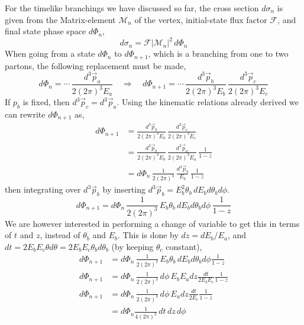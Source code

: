 \documentclass[main.tex]{subfiles}
\begin{document}
For the timelike branchings we have discussed so far, the cross section \(d\sigma_n\) is given from the Matrix-element \(\mathcal{M}_n\) of the vertex, initial-state flux factor \(\mathcal{F}\), and final state phase space \(d\Phi_n\),
\begin{equation}
    d\sigma_n = \mathcal{F} |\mathcal{M}_n|^2 \, d\Phi_n
\end{equation}
When going from a state \(d\Phi_n\) to \(d\Phi_{n+1}\), which is a branching from one to two partons, the following replacement must be made, 
\begin{equation}
    d\Phi_n = \cdots \, \frac{d^3 \vec p_a}{2(2\pi)^3 E_a} \quad \Rightarrow \quad d\Phi_{n+1} = \cdots \, \frac{d^3 \vec p_b}{2 (2\pi)^3 E_b} \, \frac{d^3 \vec p_c}{2(2\pi)^3 E_c}
\end{equation}
If \(p_b\) is fixed, then \(d^3 \vec p_c = d^3 \vec p_a\). Using the kinematic relations already derived we can rewrite \(d\Phi_{n+1}\) as,
 \begin{align}
    d\Phi_{n+1} &= \frac{d^3 \vec p_b}{2(2\pi)^3 E_b}\, \frac{d^3 \vec p_c}{2(2\pi)^3 E_c} \nonumber\\
    &=\frac{d^3 \vec p_b}{2(2\pi)^3 E_b} \,\frac{d^3 \vec p_a}{2(2\pi)^3 E_a}\, \frac{1}{1-z} \nonumber\\
    &= d\Phi_n\, \frac{1}{2(2\pi)^3}\, \frac{d^3 \vec p_b}{E_b} \,\frac{1}{1-z}
 \end{align}
then integrating over \(d^3\vec p _b\) by inserting \(d^3\vec p_b = E_b^2\theta_b\, dE_b d\theta_b d\phi\).
\begin{equation}
    d\Phi_{n+1} = d\Phi_n \,\frac{1}{2(2\pi)^3} \,E_b\theta_b\, dE_b d\theta_b d\phi \,  \frac{1}{1-z}
\end{equation}
 We are however interested in performing a change of variable to get this in terms of \(t\) and \(z\), instead of \(\theta_b\) and \(E_b\). This is done by \(dz = dE_b /E_a\), and \(dt = 2 E_b E_c \theta d\theta = 2 E_b E_c \theta_b d\theta_b\) (by keeping \(\theta_c\) constant),
\begin{align}
    d\Phi_{n+1} &= d\Phi_n \,\frac{1}{2(2\pi)^3} \, E_b\theta_b\, dE_b d\theta_b d\phi  \frac{1}{1-z}  \nonumber \\
    d\Phi_{n+1} &= d\Phi_n \,\frac{1}{2(2\pi)^3} \,d\phi \, E_b E_a dz  \frac{dt}{2E_bE_c} \frac{1}{1-z} \nonumber \\
    d\Phi_{n+1} &= d\Phi_n \,\frac{1}{2(2\pi)^3} \,d\phi \, E_a dz \frac{dt}{2E_c} \frac{1}{1-z} \nonumber \\
    &= d\Phi_n \frac{1}{4 (2\pi)^3} \, dt\, dz \, d\phi 
\end{align}
\end{document}

